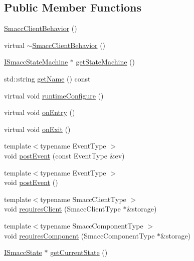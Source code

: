 \subsection*{Public Member Functions}
\begin{DoxyCompactItemize}
\item 
\hyperlink{classsmacc_1_1SmaccClientBehavior_a5fbea298db572d6c7558bfd1a65a942b}{Smacc\+Client\+Behavior} ()
\item 
virtual \hyperlink{classsmacc_1_1SmaccClientBehavior_a93dbf03b9c76a580c2de47d5bef7de0f}{$\sim$\+Smacc\+Client\+Behavior} ()
\item 
\hyperlink{classsmacc_1_1ISmaccStateMachine}{I\+Smacc\+State\+Machine} $\ast$ \hyperlink{classsmacc_1_1SmaccClientBehavior_aa817da149f366f6a28794c04eb0744b0}{get\+State\+Machine} ()
\item 
std\+::string \hyperlink{classsmacc_1_1SmaccClientBehavior_ada2ec9b296106de2261d13ef22caf81c}{get\+Name} () const
\item 
virtual void \hyperlink{classsmacc_1_1SmaccClientBehavior_a228b90d814511a24907c5d65553bcba2}{runtime\+Configure} ()
\item 
virtual void \hyperlink{classsmacc_1_1SmaccClientBehavior_a7962382f93987c720ad432fef55b123f}{on\+Entry} ()
\item 
virtual void \hyperlink{classsmacc_1_1SmaccClientBehavior_ac0cd72d42bd00425362a97c9803ecce5}{on\+Exit} ()
\item 
{\footnotesize template$<$typename Event\+Type $>$ }\\void \hyperlink{classsmacc_1_1SmaccClientBehavior_ab29b23145ea074ad69340fc0af6fbb75}{post\+Event} (const Event\+Type \&ev)
\item 
{\footnotesize template$<$typename Event\+Type $>$ }\\void \hyperlink{classsmacc_1_1SmaccClientBehavior_a3152cd2215ebc0e387a8a546de07cded}{post\+Event} ()
\item 
{\footnotesize template$<$typename Smacc\+Client\+Type $>$ }\\void \hyperlink{classsmacc_1_1SmaccClientBehavior_a917f001e763a1059af337bf4e164f542}{requires\+Client} (Smacc\+Client\+Type $\ast$\&storage)
\item 
{\footnotesize template$<$typename Smacc\+Component\+Type $>$ }\\void \hyperlink{classsmacc_1_1SmaccClientBehavior_adee6abe3a28aa6b47d3dd5267e264b4d}{requires\+Component} (Smacc\+Component\+Type $\ast$\&storage)
\item 
\hyperlink{classsmacc_1_1ISmaccState}{I\+Smacc\+State} $\ast$ \hyperlink{classsmacc_1_1SmaccClientBehavior_abf6773e4dd948f932f11a346dd6e7c2c}{get\+Current\+State} ()
\end{DoxyCompactItemize}
